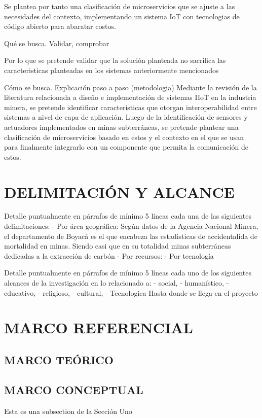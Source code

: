 \documentclass[stu,12pt,floatsintext]{apa7}
\begin{document}
		Se plantea por tanto una clasificación de microservicios que se ajuste a las necesidades del contexto, implementando un sistema IoT con tecnologias de código abierto para abaratar costos.
		
		Qué se busca. Validar, comprobar
		
		Por lo que se pretende validar que la solución planteada no sacrifica las caracteristicas planteadas en los sistemas anteriormente mencionados
		
		Cómo se busca. Explicación paso a paso (metodologia)
		Mediante la revisión de la literatura relacionada a diseño e implementación de sistemas IIoT en la industria minera, se pretende identificar caracteristicas que otorgan interoperabilidad entre sistemas a nivel de capa de aplicación. Luego de la identificación de sensores y actuadores implementados en minas subterráneas, se pretende plantear una clasificación de microservicios basado en estos y el contexto en el que se usan para finalmente integrarlo con un componente que permita la comunicación de estos.
		
		
		
	\section{DELIMITACIÓN Y ALCANCE}
	Detalle puntualmente en párrafos de mínimo 5 líneas cada una de las siguientes
	delimitaciones:
	- Por área geográfica:
	Según datos de la Agencia Nacional Minera, el departamento de Boyacá es el que encabeza las estadisticas de accidentalida de mortalidad en minas. Siendo casi que en su totalidad minas subterráneas dedicadas a la extracción de carbón
	- Por recursos:
	- Por tecnología
	
	Detalle puntualmente en párrafos de mínimo 5 líneas cada uno de los siguientes
	alcances de la investigación en lo relacionado a:
	- social,
	- humanístico,
	- educativo,
	- religioso,
	- cultural,
	- Tecnologica
	Hasta donde se llega en el proyecto
	
	\section{MARCO REFERENCIAL}
	\subsection{MARCO TEÓRICO}
	\subsection{MARCO CONCEPTUAL}
	Esta es una subsection de la Sección Uno\cite{mittelbach2004latex}
\end{document}
